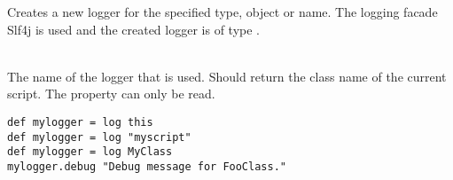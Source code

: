 %


Creates a new logger for the specified type, object or name.
The logging facade Slf4j\cite{slf4j13} is used and the created logger 
is of type \cite{logger13}.

\begin{asparadesc}
%
\item[\code{theContext}] \hfill \\
The name of the logger that is used. Should return the class name of the current
script. The property can only be read.
%
\end{asparadesc}

\begin{lstlisting}[style=Groovybash, label={lst:example_log}, title={%
Creates a new logger with the context.}]
def mylogger = log this
def mylogger = log "myscript"
def mylogger = log MyClass
mylogger.debug "Debug message for FooClass."
\end{lstlisting}

